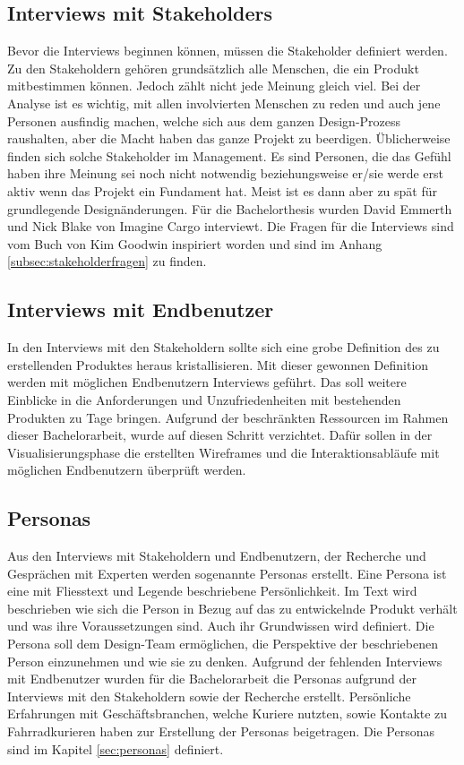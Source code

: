 \subsection{Interviews mit Stakeholders}
Bevor die Interviews beginnen können, müssen die Stakeholder definiert werden. Zu den Stakeholdern gehören grundsätzlich alle Menschen, die ein Produkt mitbestimmen können. Jedoch zählt nicht jede Meinung gleich viel. Bei der Analyse ist es wichtig, mit allen involvierten Menschen zu reden und auch jene Personen ausfindig machen, welche sich aus dem ganzen Design-Prozess raushalten, aber die Macht haben das ganze Projekt zu beerdigen. Üblicherweise finden sich solche Stakeholder im Management. Es sind Personen, die das Gefühl haben ihre Meinung sei noch nicht notwendig beziehungsweise er/sie werde erst aktiv wenn das Projekt ein Fundament hat. Meist ist es dann aber zu spät für grundlegende Designänderungen. Für die Bachelorthesis wurden David Emmerth und Nick Blake von Imagine Cargo interviewt. Die Fragen für die Interviews sind vom Buch von Kim Goodwin inspiriert worden \citep[Kapitel 5]{goodwin2011designing} und sind im Anhang \ref{subsec:stakeholderfragen} zu finden.

\subsection{Interviews mit Endbenutzer}
In den Interviews mit den Stakeholdern sollte sich eine grobe Definition des zu erstellenden Produktes heraus kristallisieren. Mit dieser gewonnen Definition werden mit möglichen Endbenutzern Interviews geführt. Das soll weitere Einblicke in die Anforderungen und Unzufriedenheiten mit bestehenden Produkten zu Tage bringen. Aufgrund der beschränkten Ressourcen im Rahmen dieser Bachelorarbeit, wurde auf diesen Schritt verzichtet. Dafür sollen in der Visualisierungsphase die erstellten Wireframes und die Interaktionsabläufe mit möglichen Endbenutzern überprüft werden.

\subsection{Personas}
Aus den Interviews mit Stakeholdern und Endbenutzern, der Recherche und Gesprächen mit Experten werden sogenannte Personas erstellt. Eine Persona ist eine mit Fliesstext und Legende beschriebene Persönlichkeit. Im Text wird beschrieben wie sich die Person in Bezug auf das zu entwickelnde Produkt verhält und was ihre Voraussetzungen sind. Auch ihr Grundwissen wird definiert. Die Persona soll dem Design-Team ermöglichen, die Perspektive der beschriebenen Person einzunehmen und wie sie zu denken. Aufgrund der fehlenden Interviews mit Endbenutzer wurden für die Bachelorarbeit die Personas aufgrund der Interviews mit den Stakeholdern sowie der Recherche erstellt. Persönliche Erfahrungen mit Geschäftsbranchen, welche Kuriere nutzten, sowie Kontakte zu Fahrradkurieren haben zur Erstellung der Personas beigetragen. Die Personas sind im Kapitel \ref{sec:personas} definiert.

